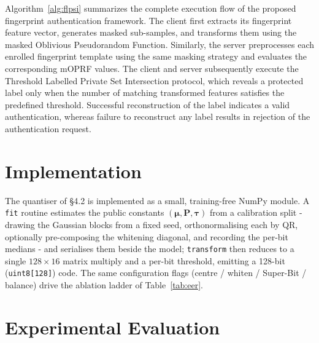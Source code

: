 \documentclass[11pt,a4paper]{article}
\begin{document}
Algorithm~\ref{alg:flpsi} summarizes the complete execution flow of the
proposed fingerprint authentication framework. The client first extracts
its fingerprint feature vector, generates masked sub-samples, and
transforms them using the masked Oblivious Pseudorandom Function.
Similarly, the server preprocesses each enrolled fingerprint template
using the same masking strategy and evaluates the corresponding mOPRF
values. The client and server subsequently execute the Threshold
Labelled Private Set Intersection protocol, which reveals a protected
label only when the number of matching transformed features satisfies
the predefined threshold. Successful reconstruction of the label
indicates a valid authentication, whereas failure to reconstruct any
label results in rejection of the authentication request.


\section{Implementation}

The quantiser of \S4.2 is implemented as a small, training-free NumPy module. A
\texttt{fit} routine estimates the public constants
$(\boldsymbol{\mu},\mathbf{P},\boldsymbol{\tau})$ from a calibration split - drawing
the Gaussian blocks from a fixed seed, orthonormalising each by QR, optionally
pre-composing the whitening diagonal, and recording the per-bit medians - and
serialises them beside the model; \texttt{transform} then reduces to a single
$128\times16$ matrix multiply and a per-bit threshold, emitting a 128-bit
(\texttt{uint8[128]}) code. The same configuration flags (centre / whiten / Super-Bit
/ balance) drive the ablation ladder of Table~\ref{tab:eer}.



\section{Experimental Evaluation}
\label{sec:eval}
\end{document}
